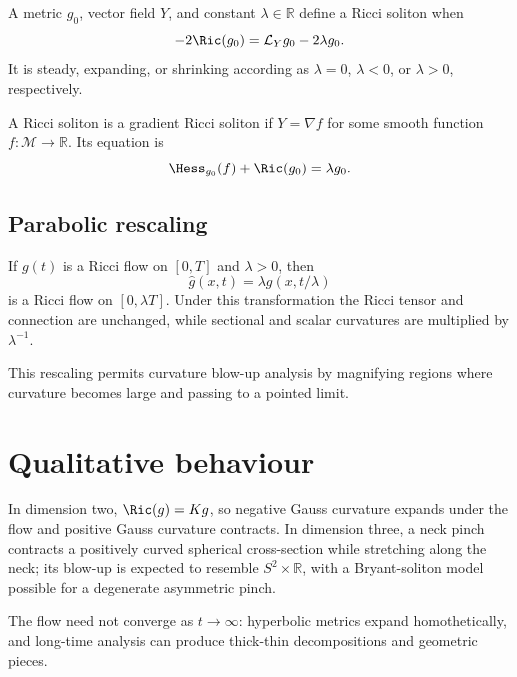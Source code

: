 \begin{definition}
\label{topping-intro-ricci-soliton}
A metric $g_0$, vector field $Y$, and constant $\lambda\in\mathbb R$ define
a Ricci soliton when
\[
-2\Ric(g_0)=\mathcal L_Yg_0-2\lambda g_0.
\]
It is steady, expanding, or shrinking according as $\lambda=0$, $\lambda<0$,
or $\lambda>0$, respectively.
\end{definition}

\begin{definition}
\label{topping-intro-gradient-soliton}
A Ricci soliton is a gradient Ricci soliton if $Y=\nabla f$ for some smooth
function $f:\mathcal M\to\mathbb R$. Its equation is
\[
\Hess_{g_0}(f)+\Ric(g_0)=\lambda g_0.
\]
\end{definition}

\subsection{Parabolic rescaling}

\begin{remark}
\label{topping-intro-parabolic-rescaling}
If $g(t)$ is a Ricci flow on $[0,T]$ and $\lambda>0$, then
\[
\hat g(x,t)=\lambda g(x,t/\lambda)
\]
is a Ricci flow on $[0,\lambda T]$. Under this transformation the Ricci tensor
and connection are unchanged, while sectional and scalar curvatures are
multiplied by $\lambda^{-1}$.
\end{remark}

This rescaling permits curvature blow-up analysis by magnifying regions where
curvature becomes large and passing to a pointed limit.

\section{Qualitative behaviour}

In dimension two, $\Ric(g)=Kg$, so negative Gauss curvature expands under the
flow and positive Gauss curvature contracts. In dimension three, a neck pinch
contracts a positively curved spherical cross-section while stretching along
the neck; its blow-up is expected to resemble $S^2\times\mathbb R$, with a
Bryant-soliton model possible for a degenerate asymmetric pinch.

The flow need not converge as $t\to\infty$: hyperbolic metrics expand
homothetically, and long-time analysis can produce thick-thin decompositions
and geometric pieces.


